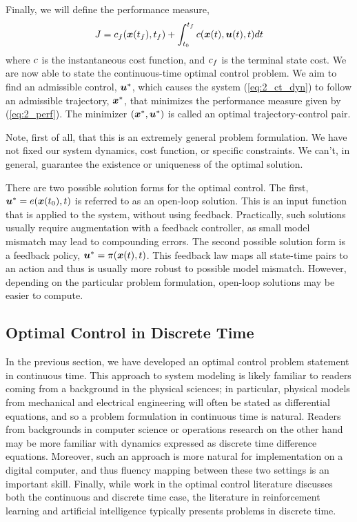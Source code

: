 Finally, we will define the performance measure, 
\begin{equation}
    J = c_f(\bm{x}(t_f),t_f) + \int_{t_0}^{t_f} c(\bm{x}(t),\bm{u}(t),t) dt
    \label{eq:2_perf}
\end{equation}
where $c$ is the instantaneous cost function, and $c_f$ is the terminal state cost. We are now able to state the continuous-time optimal control problem. 
We aim to find an admissible control, $\bm{u}^*$, which causes the system (\ref{eq:2_ct_dyn}) to follow an admissible trajectory, $\bm{x}^*$, that minimizes the performance measure given by (\ref{eq:2_perf}). The minimizer $(\bm{x}^*,\bm{u}^*)$ is called an optimal trajectory-control pair. 


Note, first of all, that this is an extremely general problem formulation. We have not fixed our system dynamics, cost function, or specific constraints. We can't, in general, guarantee the existence or uniqueness of the optimal solution. 

There are two possible solution forms for the optimal control. The first, $\bm{u}^* = e(\bm{x}(t_0),t)$ is referred to as an open-loop solution. This is an input function that is applied to the system, without using feedback. Practically, such solutions usually require augmentation with a feedback controller, as small model mismatch may lead to compounding errors. The second possible solution form is a feedback policy, $\bm{u}^* = \pi(\bm{x}(t),t)$. This feedback law maps all state-time pairs to an action and thus is usually more robust to possible model mismatch. However, depending on the particular problem formulation, open-loop solutions may be easier to compute. 

\subsection{Optimal Control in Discrete Time}

In the previous section, we have developed an optimal control problem statement in continuous time. This approach to system modeling is likely familiar to readers coming from a background in the physical sciences; in particular, physical models from mechanical and electrical engineering will often be stated as differential equations, and so a problem formulation in continuous time is natural. Readers from backgrounds in computer science or operations research on the other hand may be more familiar with dynamics expressed as discrete time difference equations. Moreover, such an approach is more natural for implementation on a digital computer, and thus fluency mapping between these two settings is an important skill. Finally, while work in the optimal control literature discusses both the continuous and discrete time case, the literature in reinforcement learning and artificial intelligence typically presents problems in discrete time.

